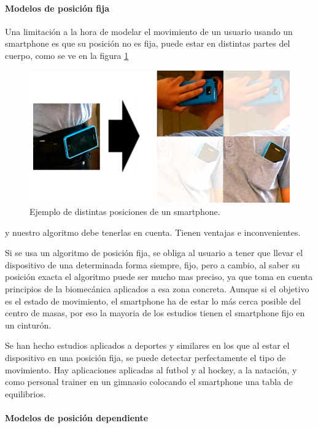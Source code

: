 \documentclass[12pt]{article}
\numberwithin{equation}{section}
\begin{document}
\paragraph{Modelos de posición fija}
Una limitación a la hora de modelar el movimiento de un usuario usando un smartphone es que su posición no es fija, puede estar en distintas partes del cuerpo, como se ve en la figura \ref{fig:posiciones}
\begin{figure}[h]
    \centering
    \includegraphics[width=1\textwidth]{position.png}
    \caption{Ejemplo de distintas posiciones de un smartphone.}
    \label{fig:posiciones}
\end{figure}

y nuestro algoritmo debe tenerlas en cuenta. Tienen ventajas e inconvenientes. 

Si se usa un algoritmo de posición fija, se obliga al usuario a tener que llevar el dispositivo de una determinada forma siempre, fijo, pero a cambio, al saber su posición exacta el algoritmo puede ser mucho mas preciso, ya que toma en cuenta principios de la biomecánica aplicados a esa zona concreta. Aunque si el objetivo es el estado de movimiento, el smartphone ha de estar lo más cerca posible del centro de masas, por eso la mayoria de los estudios tienen el smartphone fijo en un cinturón\cite{5673816}.

Se han hecho estudios aplicados a deportes y similares en los que al estar el dispositivo en una posición fija, se puede detectar perfectamente el tipo de movimiento. Hay aplicaciones aplicadas al futbol\cite{s130405317} y al hockey, a la natación\cite{Marshall:2013:SSD:2494091.2496036}, y como personal trainer en un gimnasio colocando el smartphone una tabla de equilibrios\cite{KRANZ2013203}.

\paragraph{Modelos de posición dependiente}
\end{document}
